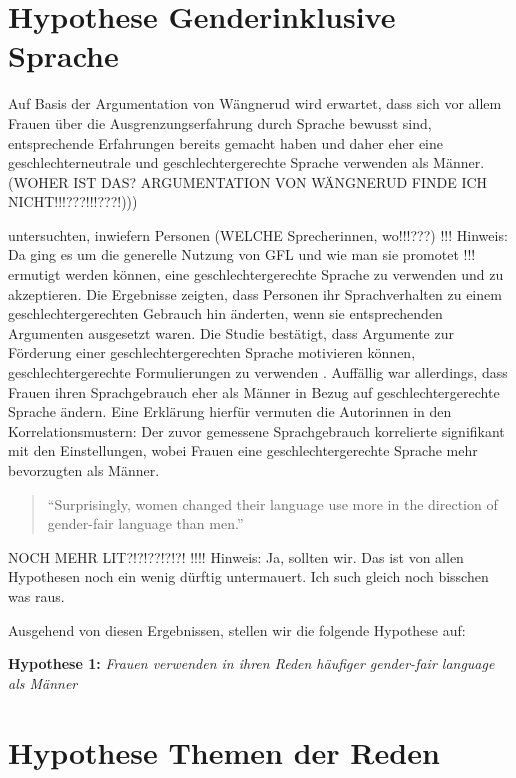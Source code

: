 \documentclass[12pt, 
    twoside=false, 
    bibliography=totoc, 
    numbers=endperiod, 
    headings=normal, 
    toc=chapterentrydotfill
    ]{scrbook}
\begin{document}
\section{Hypothese Genderinklusive Sprache}

Auf Basis der Argumentation von Wängnerud \parencites*{wangnerud_2000}{wangnerud_2009} wird erwartet, dass sich vor allem Frauen über die Ausgrenzungserfahrung durch Sprache bewusst sind, entsprechende Erfahrungen bereits gemacht haben und daher eher eine geschlechterneutrale und geschlechtergerechte Sprache verwenden als Männer.  (WOHER IST DAS? ARGUMENTATION VON WÄNGNERUD FINDE ICH NICHT!!!???!!!???!))) 

\textcite{koeser_2014} untersuchten, inwiefern Personen (WELCHE Sprecherinnen, wo!!!???) !!! Hinweis: Da ging es um die generelle Nutzung von GFL und wie man sie promotet !!! ermutigt werden können, eine geschlechtergerechte Sprache zu verwenden und zu akzeptieren. Die Ergebnisse zeigten, dass Personen ihr Sprachverhalten zu einem geschlechtergerechten Gebrauch hin änderten, wenn sie entsprechenden Argumenten ausgesetzt waren. Die Studie bestätigt, dass Argumente zur Förderung einer geschlechtergerechten Sprache motivieren können, geschlechtergerechte Formulierungen zu verwenden \parencite[548]{koeser_2014}. Auffällig war allerdings, dass Frauen ihren Sprachgebrauch eher als Männer in Bezug auf geschlechtergerechte Sprache ändern. Eine Erklärung hierfür vermuten die Autorinnen in den Korrelationsmustern: Der zuvor gemessene Sprachgebrauch korrelierte signifikant mit den Einstellungen, wobei Frauen eine geschlechtergerechte Sprache mehr bevorzugten als Männer\parencite[555]{koeser_2014}.

\begin{quote}
    \enquote {Surprisingly, women changed their language use more in the direction of gender-fair language than men.} \parencite[555]{koeser_2014}
\end{quote}


NOCH MEHR LIT?!?!??!?!?! !!!! Hinweis: Ja, sollten wir. Das ist von allen Hypothesen noch ein wenig dürftig untermauert. Ich such gleich noch bisschen was raus.

Ausgehend von diesen Ergebnissen, stellen wir die folgende Hypothese auf: 


\textbf{Hypothese 1:} \emph{Frauen verwenden in ihren Reden häufiger gender-fair language als Männer}



\section{Hypothese Themen der Reden}
\end{document}
